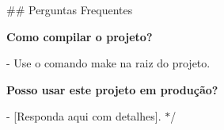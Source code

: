 
\begin{DoxyItemize}
\item 
\item \#\# Perguntas Frequentes
\end{DoxyItemize}


\begin{DoxyItemize}
\item {\bfseries{Como compilar o projeto?}}
\item -\/ Use o comando {\ttfamily make} na raiz do projeto.
\end{DoxyItemize}


\begin{DoxyItemize}
\item {\bfseries{Posso usar este projeto em produção?}}
\item -\/ \mbox{[}Responda aqui com detalhes\mbox{]}. $\ast$/ 
\end{DoxyItemize}